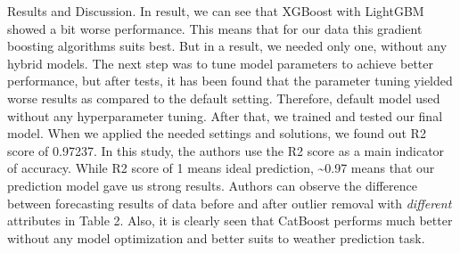 Results and Discussion. In result, we can see that XGBoost with LightGBM
showed a bit worse performance. This means that for our data this
gradient boosting algorithms suits best. But in a result, we needed only
one, without any hybrid models. The next step was to tune model
parameters to achieve better performance, but after tests, it has been
found that the parameter tuning yielded worse results as compared to the
default setting. Therefore, default model used without any
hyperparameter tuning. After that, we trained and tested our final
model. When we applied the needed settings and solutions, we found out
R2 score of 0.97237. In this study, the authors use the R2 score as a
main indicator of accuracy. While R2 score of 1 means ideal prediction,
\textasciitilde0.97 means that our prediction model gave us strong
results. Authors can observe the difference between forecasting results
of data before and after outlier removal with \emph{different}
attributes in Table 2. Also, it is clearly seen that CatBoost performs
much better without any model optimization and better suits to weather
prediction task.


